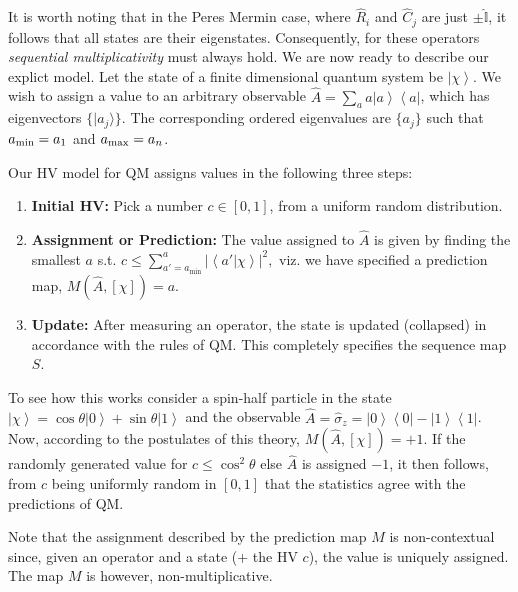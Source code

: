 \documentclass[british,aps,prl,superscriptaddress,nofootinbib,times,reprint]{revtex4-1}
\theoremstyle{plain}
\theoremstyle{plain}
\theoremstyle{definition}
\theoremstyle{remark}
\theoremstyle{remark}
\theoremstyle{remark}
\theoremstyle{plain}
\theoremstyle{plain}
\theoremstyle{plain}
\theoremstyle{definition}
\theoremstyle{definition}
\begin{document}
It is worth noting that in the Peres Mermin
case, where $\hat{R}_{i}$ and $\hat{C}_{j}$ are
just $\pm\hat{\mathbb{I}}$, it follows that all
states are their eigenstates. Consequently, for
these operators \emph{sequential multiplicativity}
must always hold.
We are now ready to describe our explict model.
Let the state of a finite dimensional quantum system
be $\left|\chi\right\rangle $. We wish to
assign a value to an arbitrary observable 
$\hat{A}=\sum_{a}a\left|a\right\rangle
\left\langle a\right|$, which has 
eigenvectors $\{ \vert
a_j\rangle \}$. The corresponding ordered eigenvalues are $\{a_j\}$ such that 
$a_{\rm min}=a_1$
and 
$a_{\rm max}=a_n$.

Our HV model for QM assigns values in the following
three steps:
\setdefaultleftmargin{0pt}{}{}{}{}{}
\begin{enumerate}
\item
{\bf Initial HV:} Pick a number
$c\in[0,1]$, from a uniform random distribution.\
\item
{\bf
Assignment or Prediction:}
 The value assigned to
$\hat{A}$ is given by finding the smallest $a$
s.t.  $c\le\sum_{a'=a_{\text{min}}}^{a}\left|\left\langle
a'|\chi\right\rangle \right|^{2},$ viz. we have
specified a prediction map, $M(\hat{A},[\chi ])=a$.
\item
{\bf Update:} After measuring an operator, the state is
updated (collapsed) in accordance with the rules
of QM. This completely specifies the sequence map
$S$.
\end{enumerate}
To see how this works consider 
a spin-half particle in the state
$\left|\chi\right\rangle
=\cos\theta\left|0\right\rangle
+\sin\theta\left|1\right\rangle $ and the observable
$\hat{A}=\hat{\sigma}_{z}=\left|0\right\rangle
\left\langle 0\right|-\left|1\right\rangle
\left\langle 1\right|$. Now, according to the
postulates of this theory, $M(\hat{A},[\chi])=+1$.
If
the randomly generated value for 
$c\le\cos^{2}\theta$ else $\hat{A}$ is assigned
$-1$, it then follows,  from $c$ being uniformly
random in $[0,1]$ that the statistics agree with
the predictions of QM.

Note that the assignment described by the
prediction map $M$ is non-contextual since, given
an operator and a state (+ the HV $c$), the value is
uniquely assigned. The map $M$ is however,
non-multiplicative. 
\end{document}
